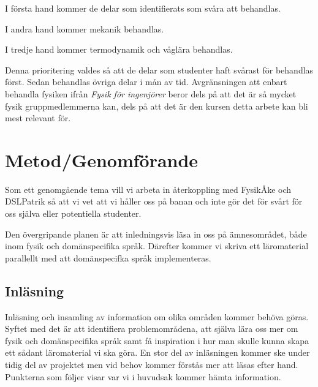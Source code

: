 \documentclass[12pt,a4paper]{scrartcl}
\begin{document}
I första hand kommer de delar som identifierats som svåra att behandlas.

I andra hand kommer mekanik behandlas.

I tredje hand kommer termodynamik och våglära behandlas.

Denna prioritering valdes så att de delar som studenter haft svårast för behandlas först. Sedan behandlas övriga delar i mån av tid. Avgränsningen att enbart behandla fysiken ifrån \textit{Fysik för ingenjörer} beror dels på att det är så mycket fysik gruppmedlemmerna kan, dels på att det är den kursen detta arbete kan bli mest relevant för.





\section{Metod/Genomförande}

Som ett genomgående tema vill vi arbeta in återkoppling med FysikÅke och DSLPatrik så att vi vet att vi håller oss på banan och inte gör det för svårt för oss själva eller potentiella studenter.

Den övergripande planen är att inledningsvis läsa in oss på ämnesområdet, både inom fysik och domänspecifika språk. Därefter kommer vi skriva ett läromaterial parallellt med att domänspecifka språk implementeras.

\subsection{Inläsning}

Inläsning och insamling av information om olika områden kommer behöva göras. Syftet med det är att identifiera problemområdena, att själva lära oss mer om fysik och domänspecifika språk samt få inspiration i hur man skulle kunna skapa ett sådant läromaterial vi ska göra. En stor del av inläsningen kommer ske under tidig del av projektet men vid behov kommer förstås mer att läsas efter hand. Punkterna som följer visar var vi i huvudsak kommer hämta information.
\end{document}

